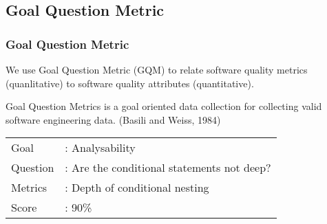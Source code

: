 \subsection{Goal Question Metric}
\begin{frame}
\frametitle{Goal Question Metric}

We use Goal Question Metric (GQM) to relate software quality metrics (quanlitative) to software quality attributes (quantitative).

\begin{definition}
Goal Question Metrics is a goal oriented data collection for collecting valid software engineering data. (Basili and Weiss, 1984)
\end{definition} \pause

\begin{example}
\begin{tabular}{ l l }
Goal &: Analysability \\
Question &: Are the conditional statements not deep? \\
Metrics &: Depth of conditional nesting\\
Score &: 90\%\\
\end{tabular}
\end{example}

\end{frame}

